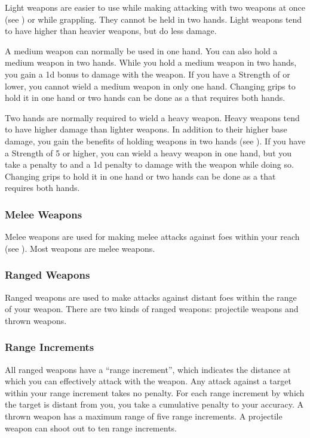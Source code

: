             \label{Light Weapons} Light weapons are easier to use while making attacking with two weapons at once (see ) or while grappling.
            They cannot be held in two hands.
            Light weapons tend to have higher  than heavier weapons, but do less damage.

             A medium weapon can normally be used in one hand.
            You can also hold a medium weapon in two hands.
            While you hold a medium weapon in two hands, you gain a \plus1d bonus to damage with the weapon.
            If you have a Strength of  or lower, you cannot wield a medium weapon in only one hand.
            Changing grips to hold it in one hand or two hands can be done as a  that requires both hands.

             Two hands are normally required to wield a heavy weapon.
            Heavy weapons tend to have higher damage than lighter weapons.
            In addition to their higher base damage, you gain the benefits of holding weapons in two hands (see ).
            If you have a Strength of 5 or higher, you can wield a heavy weapon in one hand, but you take a  penalty to  and a \minus1d penalty to damage with the weapon while doing so.
            Changing grips to hold it in one hand or two hands can be done as a  that requires both hands.

        \subsubsection{Melee Weapons}
            Melee weapons are used for making melee attacks against foes within your reach (see ). Most weapons are melee weapons.

        \subsubsection{Ranged Weapons}
            Ranged weapons are used to make attacks against distant foes within the range of your weapon. There are two kinds of ranged weapons: projectile weapons and thrown weapons.

            \subsubsection{Range Increments}\label{Range Increment} All ranged weapons have a ``range increment'', which indicates the distance at which you can effectively attack with the weapon. Any attack against a target within your range increment takes no penalty. For each range increment by which the target is distant from you, you take a cumulative  penalty to your accuracy. A thrown weapon has a maximum range of five range increments. A projectile weapon can shoot out to ten range increments.


